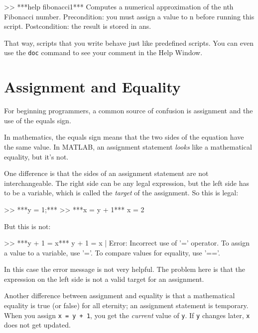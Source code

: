 \begin{code}
>> ***help fibonacci1***
  Computes a numerical approximation of the nth Fibonacci number.  
  Precondition: you must assign a value to n before running this script.
  Postcondition: the result is stored in ans.
\end{code}

That way, scripts that you write behave just like predefined scripts.
You can even use the \lstinline{doc} command to see your comment in the
Help Window.


\section{Assignment and Equality}

For beginning programmers, a common source of confusion is assignment and the use of the equals sign.


In mathematics, the equals sign means that the two sides of the
equation have the same value.
In MATLAB, an assignment statement {\em looks} like a mathematical equality, but it's not.

One difference is that the sides of an assignment statement are not
interchangeable.  The right side can be any legal expression, but
the left side has to be a variable, which is called the 
{\em target} of the assignment.  So this is legal:

\begin{code}
>> ***y = 1;***
>> ***x = y + 1***
x = 2
\end{code}

But this is not:

\begin{code}
>> ***y + 1 = x***
 y + 1 = x
       |
Error: Incorrect use of '=' operator. 
To assign a value to a variable, use '='. 
To compare values for equality, use '=='.
\end{code}

In this case the error message is not very helpful.  The problem here is that the expression on the left side is not a valid target for an assignment.


Another difference between assignment and equality is that a mathematical equality is true (or false) for all eternity;
an assignment statement is temporary.
When you assign \lstinline{x = y + 1}, you get the
{\em current} value of \lstinline{y}.  If \lstinline{y} changes later, \lstinline{x}
does not get updated.

